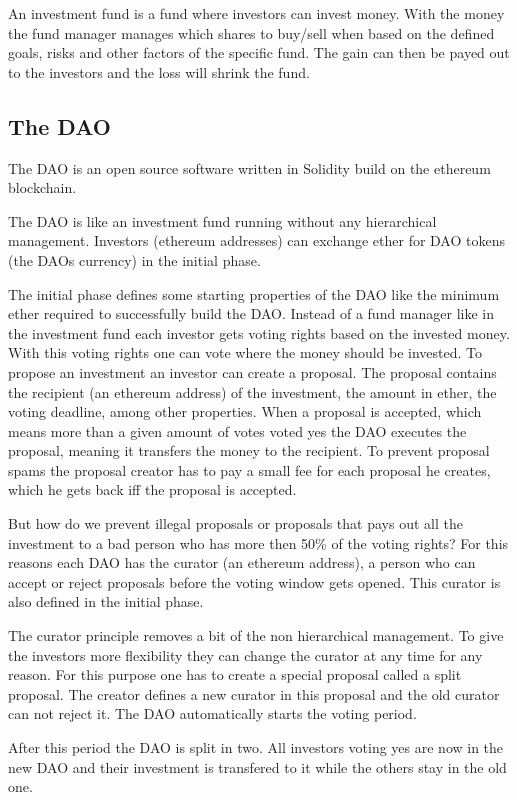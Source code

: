 \documentclass[a4paper, 11pt]{scrartcl}
\begin{document}
An investment fund is a fund where investors can invest money.
With the money the fund manager manages which shares to buy/sell when based on the defined goals, risks and other factors of the specific fund.
The gain can then be payed out to the investors and the loss will shrink the fund.

\subsection{The DAO}

The DAO is an open source software written in Solidity build on the ethereum blockchain.

The DAO is like an investment fund running without any hierarchical management.
Investors (ethereum addresses) can exchange ether for DAO tokens (the DAOs currency) in the initial phase.

The initial phase defines some starting properties of the DAO like the minimum ether required to successfully build the DAO.
Instead of a fund manager like in the investment fund each investor gets voting rights based on the invested money.
With this voting rights one can vote where the money should be invested.
To propose an investment an investor can create a proposal.
The proposal contains the recipient (an ethereum address) of the investment, the amount in ether, the voting deadline, among other properties.
When a proposal is accepted, which means more than a given amount of votes voted yes the DAO executes the proposal, meaning it transfers the money to the recipient.
To prevent proposal spams the proposal creator has to pay a small fee for each proposal he creates, which he gets back iff the proposal is accepted.

But how do we prevent illegal proposals or proposals that pays out all the investment to a bad person who has more then 50\% of the voting rights?
For this reasons each DAO has the curator (an ethereum address), a person who can accept or reject proposals before the voting window gets opened.
This curator is also defined in the initial phase.

The curator principle removes a bit of the non hierarchical management.
To give the investors more flexibility they can change the curator at any time for any reason.
For this purpose one has to create a special proposal called a split proposal.
The creator defines a new curator in this proposal and the old curator can not reject it.
The DAO automatically starts the voting period.

After this period the DAO is split in two.
All investors voting yes are now in the new DAO and their investment is transfered to it while the others stay in the old one.
\end{document}
